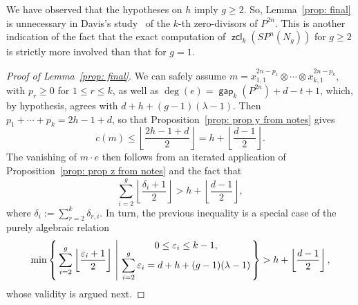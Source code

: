 \documentclass[amscd,amssymb,verbatim,10pt]{amsart}
\numberwithin{equation}{section}
\theoremstyle{plain}
\theoremstyle{definition}
\DeclareMathOperator{\zcl}{{\mathsf{zcl}}}
\DeclareMathOperator{\gap}{{\mathsf{gap}}}
\begin{document}
We have observed that the hypotheses on $h$ imply $g\ge 2$. So, Lemma~\ref{prop: final} is unnecessary in Davis's study~\cite{Dav} of the $k$-th zero-divisors of $P^{2n}$. This is another indication of the fact that the exact computation of $\zcl_k(SP^n(N_g))$ for $g\ge 2$ is strictly more involved than that for $g=1$.

\begin{proof}[Proof of Lemma~\ref{prop: final}]
We can safely assume $m=x_{1,1}^{2n-p_1}\otimes\cdots\otimes x_{k,1}^{2n-p_k}$, with $p_r\ge 0$ for $1\le r\le k$, as well as $\deg(e)=\gap_k(P^{2n})+d-t+1$, which, by hypothesis, agrees with $d+h+(g-1)(\lambda-1)$. Then $p_1+\cdots+p_k=2h-1+d$, so that Proposition~\ref{prop: prop y from notes} gives
\[
c(m)\le\left\lfloor\frac{2h-1+d}{2}\right\rfloor=h+\left\lfloor\frac{d-1}{2}\right\rfloor.
\]
The vanishing of $m\cdot e$ then follows from an iterated application of Proposition~\ref{prop: prop z from notes} and the fact that
\[
\sum_{i=2}^g\left\lfloor \frac{\delta_i+1}{2} \right\rfloor>h+\left\lfloor\frac{d-1}{2}\right\rfloor,
\]
where $\delta_i:=\sum_{r=2}^k\delta_{r,i}$.  In turn, the previous inequality is a special case of the purely algebraic relation
\begin{equation}\label{alternativa}
\min\left\{ \,\sum_{i=2}^g\left\lfloor \frac{\varepsilon_i+1}{2} \right\rfloor\ \middle|\ 
\begin{matrix}
0\le\varepsilon_i\le k-1, &  \\ \displaystyle\sum_{i=2}^g\varepsilon_i=d+h+(g-1)(\lambda-1) &
\end{matrix}\hspace{-3mm}\right\}>h+\left\lfloor\frac{d-1}2\right\rfloor,
\end{equation}
whose validity is argued next.


\end{proof}
\end{document}
